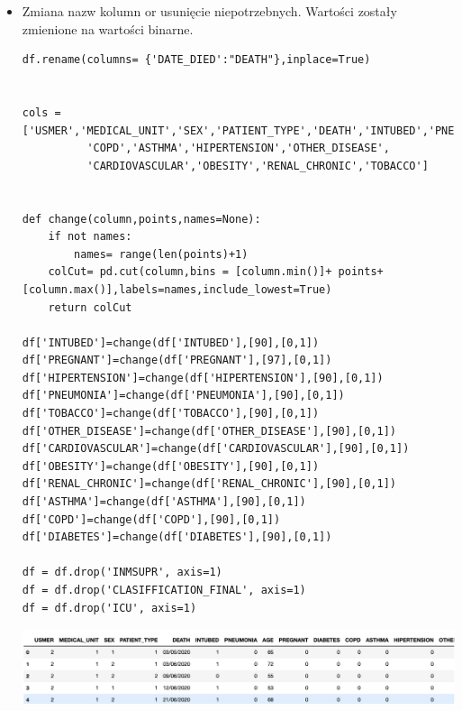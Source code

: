 \documentclass{article}
\begin{document}
\begin{itemize}
\begin{center}
\end{center}
\item Zmiana nazw kolumn or usunięcie niepotrzebnych. Wartości zostały zmienione na wartości binarne.
\begin{lstlisting}
df.rename(columns= {'DATE_DIED':"DEATH"},inplace=True)


cols =['USMER','MEDICAL_UNIT','SEX','PATIENT_TYPE','DEATH','INTUBED','PNEUMONIA','AGE','PREGNANT','DIABETES',
          'COPD','ASTHMA','HIPERTENSION','OTHER_DISEASE',
          'CARDIOVASCULAR','OBESITY','RENAL_CHRONIC','TOBACCO']

          
def change(column,points,names=None):
    if not names:
        names= range(len(points)+1)
    colCut= pd.cut(column,bins = [column.min()]+ points+[column.max()],labels=names,include_lowest=True)
    return colCut

df['INTUBED']=change(df['INTUBED'],[90],[0,1])
df['PREGNANT']=change(df['PREGNANT'],[97],[0,1])
df['HIPERTENSION']=change(df['HIPERTENSION'],[90],[0,1])
df['PNEUMONIA']=change(df['PNEUMONIA'],[90],[0,1])
df['TOBACCO']=change(df['TOBACCO'],[90],[0,1])
df['OTHER_DISEASE']=change(df['OTHER_DISEASE'],[90],[0,1])
df['CARDIOVASCULAR']=change(df['CARDIOVASCULAR'],[90],[0,1])
df['OBESITY']=change(df['OBESITY'],[90],[0,1])
df['RENAL_CHRONIC']=change(df['RENAL_CHRONIC'],[90],[0,1])
df['ASTHMA']=change(df['ASTHMA'],[90],[0,1])
df['COPD']=change(df['COPD'],[90],[0,1])
df['DIABETES']=change(df['DIABETES'],[90],[0,1])

df = df.drop('INMSUPR', axis=1)
df = df.drop('CLASIFFICATION_FINAL', axis=1)
df = df.drop('ICU', axis=1)

\end{lstlisting}
\begin{center}
    \includegraphics[width=1.0\textwidth]{image3.png}\newline
\end{center}
\end{itemize}
\end{document}
